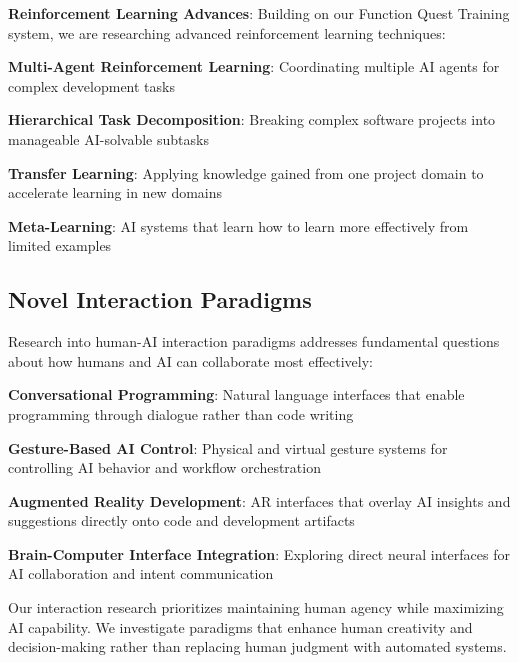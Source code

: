 \textbf{Reinforcement Learning Advances}:
Building on our Function Quest Training system, we are researching advanced reinforcement learning techniques:

\begin{compactlist}
    \item \textbf{Multi-Agent Reinforcement Learning}: Coordinating multiple AI agents for complex development tasks
    \item \textbf{Hierarchical Task Decomposition}: Breaking complex software projects into manageable AI-solvable subtasks
    \item \textbf{Transfer Learning}: Applying knowledge gained from one project domain to accelerate learning in new domains
    \item \textbf{Meta-Learning}: AI systems that learn how to learn more effectively from limited examples
\end{compactlist}

\subsection*{Novel Interaction Paradigms}

Research into human-AI interaction paradigms addresses fundamental questions about how humans and AI can collaborate most effectively:

\begin{expandedlist}
    \item \textbf{Conversational Programming}: Natural language interfaces that enable programming through dialogue rather than code writing
    \item \textbf{Gesture-Based AI Control}: Physical and virtual gesture systems for controlling AI behavior and workflow orchestration
    \item \textbf{Augmented Reality Development}: AR interfaces that overlay AI insights and suggestions directly onto code and development artifacts
    \item \textbf{Brain-Computer Interface Integration}: Exploring direct neural interfaces for AI collaboration and intent communication
\end{expandedlist}

\begin{infobox}[title=Interaction Research Focus]
Our interaction research prioritizes maintaining human agency while maximizing AI capability. We investigate paradigms that enhance human creativity and decision-making rather than replacing human judgment with automated systems.
\end{infobox}


